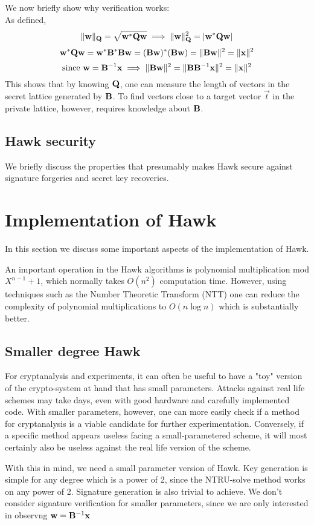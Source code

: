 We now briefly show why verification works: \\
As defined, 
\[
    \lVert \mathbf{w} \rVert_{\mathbf{Q}} = \sqrt{\mathbf{w}^* \mathbf{Q} \mathbf{w}} \implies \lVert \mathbf{w} \rVert_{\mathbf{Q}} ^2 = |\mathbf{w}^* \mathbf{Q} \mathbf{w}| \\
\]
\[
    \mathbf{w}^* \mathbf{Q} \mathbf{w} = \mathbf{w}^* \mathbf{B}^* \mathbf{B} \mathbf{w} = (\mathbf{B} \mathbf{w})^* (\mathbf{B} \mathbf{w}) = \lVert \mathbf{B} \mathbf{w} \rVert ^2
    = \lVert \mathbf{x} \rVert ^2
\]
\[
    \text{since } \mathbf{w} = \mathbf{B}^{-1} \mathbf{x} \implies \lVert \mathbf{B} \mathbf{w} \rVert ^2 = \lVert \mathbf{B} \mathbf{B}^{-1} \mathbf{x} \rVert ^2 = \lVert \mathbf{x} \rVert ^2
\]
This shows that by knowing $\mathbf{Q}$, one can measure the length of vectors in the secret lattice generated by $\mathbf{B}$. To find vectors close to a target vector $\vec{t}$ 
in the private lattice, however, requires knowledge about $\mathbf{B}$.
\subsection{Hawk security}
We briefly discuss the properties that presumably makes Hawk secure against signature forgeries and secret key recoveries.
\section{Implementation of Hawk}
In this section we discuss some important aspects of the implementation of Hawk.

An important operation in the Hawk algorithms is polynomial multiplication mod $X^{n-1} + 1$, which normally takes $O(n^2)$ computation time.
However, using techniques such as the Number Theoretic Transform (NTT) \cite{NTT24} one can reduce the complexity of polynomial multiplications to $O(n \log{n})$ which is substantially better.
\subsection{Smaller degree Hawk}
For cryptanalysis and experiments, it can often be useful to have a "toy" version of the crypto-system at hand that has small parameters. Attacks against real life schemes may take days, even with good hardware and carefully implemented code. 
With smaller parameters, however, one can more easily check if a method for cryptanalysis is a viable candidate for further experimentation. Conversely, if a specific method appears useless facing a small-parametered scheme, it will most certainly
also be useless against the real life version of the scheme.

With this in mind, we need a small parameter version of Hawk.
Key generation is simple for any degree which is a power of 2, since the NTRU-solve method works on any power of 2.
Signature generation is also trivial to achieve. We don't consider signature verification for smaller parameters, since we are only interested in observng $\mathbf{w} = \mathbf{B}^{-1} \mathbf{x}$
